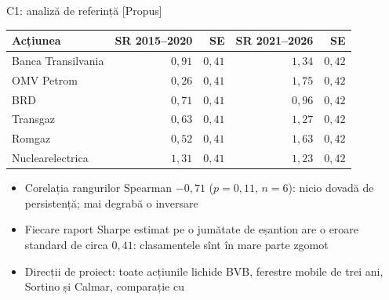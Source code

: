 \ifsolutions
\begin{frame}{C1: analiză de referință [Propus]}
\itemsize{\footnotesize}
\begin{center}
\footnotesize
\begin{tabular}{lrrrr}
\toprule
Acțiunea & SR 2015--2020 & SE & SR 2021--2026 & SE \\
\midrule
Banca Transilvania & $0{,}91$ & $0{,}41$ & $1{,}34$ & $0{,}42$ \\
OMV Petrom & $0{,}26$ & $0{,}41$ & $1{,}75$ & $0{,}42$ \\
BRD & $0{,}71$ & $0{,}41$ & $0{,}96$ & $0{,}42$ \\
Transgaz & $0{,}63$ & $0{,}41$ & $1{,}27$ & $0{,}42$ \\
Romgaz & $0{,}52$ & $0{,}41$ & $1{,}63$ & $0{,}42$ \\
Nuclearelectrica & $1{,}31$ & $0{,}41$ & $1{,}23$ & $0{,}42$ \\
\bottomrule
\end{tabular}
\end{center}
\begin{itemize}
    \item Corelația rangurilor Spearman $-0{,}71$ ($p = 0{,}11$, $n = 6$): nicio dovadă de persistență; mai degrabă o inversare
    \item Fiecare raport Sharpe estimat pe o jumătate de eșantion are o eroare standard de circa $0{,}41$: clasamentele sînt în mare parte zgomot
    \item Direcții de proiect: toate acțiunile lichide BVB, ferestre mobile de trei ani, Sortino și Calmar, comparație cu 
\end{itemize}
\end{frame}
\fi

